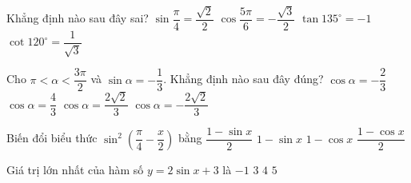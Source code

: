 	\begin{ex}%
	Khẳng định nào sau đây sai?
	\choice
		{$\sin \dfrac{\pi}{4}=\dfrac{\sqrt{2}}{2}$}
		{$\cos \dfrac{5\pi}{6}=-\dfrac{\sqrt{3}}{2}$}
		{$\tan 135^{\circ}=-1$}
		{\True $\cot 120^{\circ}=\dfrac{1}{\sqrt{3}}$}
			\end{ex}
			
	\begin{ex}%
	Cho $\pi < \alpha < \dfrac{3\pi}{2}$ và $\sin \alpha=-\dfrac{1}{3}$. Khẳng định nào sau đây đúng?
		\choice
	{$\cos \alpha=-\dfrac{2}{3}$}
	{$\cos \alpha=\dfrac{4}{3}$}
	{$\cos \alpha=\dfrac{2\sqrt{2}}{3}$}
	{\True $\cos \alpha=-\dfrac{2\sqrt{2}}{3}$}
	\end{ex}
			
	\begin{ex}%
	Biến đổi biểu thức $\sin ^2\left(\dfrac{\pi}{4}-\dfrac{x}{2}\right)$ bằng
	\choice
	{\True $\dfrac{1-\sin x}{2}$}
	{$1-\sin x$}
	{$1-\cos x$}
	{$\dfrac{1-\cos x}{2}$}
	\end{ex}
	\begin{ex}%
	Giá trị lớn nhất của hàm số $y=2\sin x+3$ là
	\choice
	{$-1$}
	{$3$}
	{$4$}
	{\True $5$}
	\end{ex}
			
